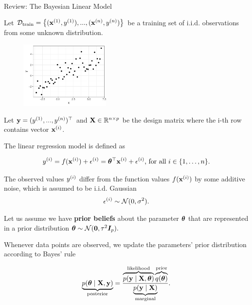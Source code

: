 \begin{frame}[c, allowframebreaks]{Review: The Bayesian Linear Model}

Let $\mathcal{D}_{\text{train}} = \left\{(\mathbf{x}^{(1)},y^{(1)}), ..., (\mathbf{x}^{(n)},y^{(n)})\right\}$ be a training set of i.i.d. observations from some unknown distribution.
\begin{figure}
  \includegraphics[width=0.4\textwidth]{figure_man/bayes-lm/example.pdf}
\end{figure}

Let $\textbf{y} = (y^{(1)}, ..., y^{(n)})^\top$ and $\mathbf{X} \in \mathbb{R}^{n \times p}$ be the design matrix where the i-th row contains vector $\mathbf{x}^{(i)}$. 





\framebreak

The linear regression model is defined as


$$
y^{(i)} = f(\mathbf{x}^{(i)}) + \epsilon^{(i)} = \bm{\theta}^\top \mathbf{x}^{(i)} + \epsilon^{(i)} \text{, for all } i \in \{1,\dots,n\}.
$$

\lz 

\lz 

The observed values $y^{(i)}$ differ from the function values $f(\mathbf{x}^{(i)})$ by some additive noise, which is assumed to be i.i.d. Gaussian 
$$\epsilon^{(i)} \sim \mathcal{N} (0, \sigma^2).$$


\framebreak
Let us assume we have \textbf{prior beliefs} about the parameter $\bm{\theta}$ that are represented in a prior distribution $\bm{\theta} \sim \mathcal{N} (\mathbf{0}, \tau^2 \boldsymbol{I}_p).$

\lz 

Whenever data points are observed, we update the parameters' prior distribution according to Bayes' rule 

$$
\underbrace{p(\bm{\theta} \mid \mathbf{X}, \mathbf{y})}_{\text{posterior}} = \frac{\overbrace{p(\mathbf{y} \mid \mathbf{X}, \bm{\theta})}^{\text{likelihood}}\overbrace{q(\bm{\theta})}^{\text{prior}}}{\underbrace{p(\mathbf{y}\mid\mathbf{X})}_{\text{marginal}}}.
$$



\end{frame}
